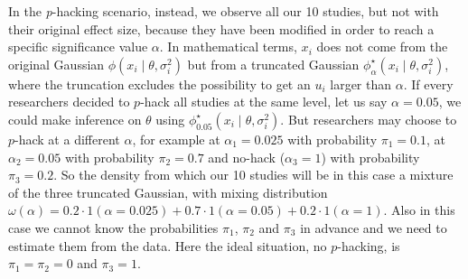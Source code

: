 In the \textit{p}-hacking scenario, instead, we observe all our 10 studies, but not with their original effect size, because they have been modified in order to reach a specific significance value $\alpha$. In mathematical terms, $x_i$ does not come from the original Gaussian $\phi(x_{i}\mid\theta,\sigma^2_{i})$ but from a truncated Gaussian $\phi_\alpha^{\star}(x_{i}\mid\theta,\sigma^2_{i})$, where the truncation excludes the possibility to get an $u_i$ larger than $\alpha$. If every researchers decided to $p$-hack all studies at the same level, let us say $\alpha = 0.05$, we could make inference on $\theta$ using $\phi_{0.05}^{\star}(x_{i}\mid\theta,\sigma^2_{i})$. But researchers may choose to $p$-hack at a different $\alpha$, for example at $\alpha_1 = 0.025$ with probability $\pi_1=  0.1$, at $\alpha_2 = 0.05$ with probability $\pi_2 = 0.7$ and no-hack ($\alpha_3 = 1$) with probability $\pi_3 = 0.2$. So the density from which our 10 studies will be in this case a mixture of the three truncated Gaussian, with mixing distribution $\omega(\alpha) = 0.2 \cdot 1(\alpha = 0.025) + 0.7 \cdot 1(\alpha = 0.05) + 0.2 \cdot 1(\alpha = 1)$. Also in this case we cannot know the probabilities $\pi_1$, $\pi_2$ and $\pi_3$ in advance and we need to estimate them from the data. Here the ideal situation, no $p$-hacking, is $\pi_1 = \pi_2 = 0$ and $\pi_3 = 1$.
